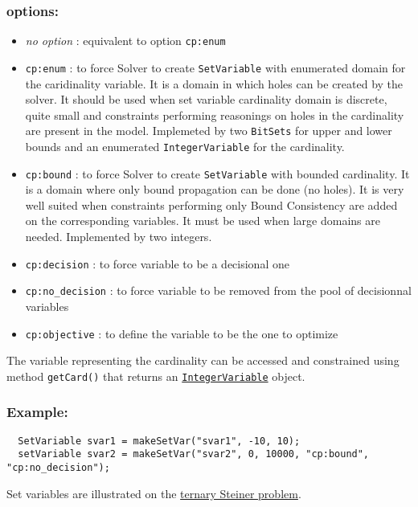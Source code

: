 \subsubsection{options:}
	\begin{itemize}
		\item \emph{no option} : equivalent to option \texttt{cp:enum}
		\item \texttt{cp:enum} : to force Solver to create \texttt{SetVariable} with enumerated domain for the caridinality variable. It is a domain in which holes can be created by the solver. It should be used when set variable cardinality domain is discrete, quite small and constraints performing reasonings on holes in the cardinality are present in the model. Implemeted by two \texttt{BitSets} for upper and lower bounds and an enumerated \texttt{IntegerVariable} for the cardinality.
		\item \texttt{cp:bound} : to force Solver to create \texttt{SetVariable} with bounded cardinality. It is a domain where only bound propagation can be done (no holes). It is very well suited when constraints performing only Bound Consistency are added on the corresponding variables. It must be used when large domains are needed. Implemented by two integers.
		\item \texttt{cp:decision} : to force variable to be a decisional one
		\item \texttt{cp:no\_decision} : to force variable to be removed from the pool of decisionnal variables
		\item \texttt{cp:objective} : to define the variable to be the one to optimize
	\end{itemize}

The variable representing the cardinality can be accessed and constrained using method \texttt{getCard()} that returns an \hyperlink{integervariable}{\tt IntegerVariable} object.

\subsubsection{Example:}
\begin{lstlisting}
  SetVariable svar1 = makeSetVar("svar1", -10, 10);
  setVariable svar2 = makeSetVar("svar2", 0, 10000, "cp:bound", "cp:no_decision");
\end{lstlisting} 

Set variables are illustrated on the \hyperlink{model:example2:ternarysteinerchoco}{ternary Steiner problem}. 


